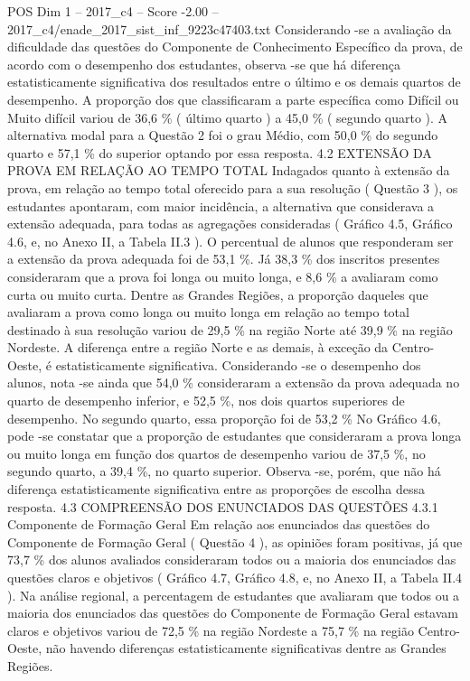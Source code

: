 \begin{textsample}{POS Dim 1 – 2017\_c4 – Score -2.00 – 2017\_c4/enade\_2017\_sist\_inf\_9223c47403.txt}
Considerando -se a avaliação da dificuldade das questões do Componente de Conhecimento Específico da prova, de acordo com o desempenho dos estudantes, observa -se que há diferença estatisticamente significativa dos resultados entre o último e os demais quartos de desempenho.
A proporção dos que classificaram a parte específica como Difícil ou Muito difícil variou de 36,6 \% ( último quarto ) a 45,0 \% ( segundo quarto ).
A alternativa modal para a Questão 2 foi o grau Médio, com 50,0 \% do segundo quarto e 57,1 \% do superior optando por essa resposta. 4.2 EXTENSÃO DA PROVA EM RELAÇÃO AO TEMPO TOTAL Indagados quanto à extensão da prova, em relação ao tempo total oferecido para a sua resolução ( Questão 3 ), os estudantes apontaram, com maior incidência, a alternativa que considerava a extensão adequada, para todas as agregações consideradas ( Gráfico 4.5, Gráfico 4.6, e, no Anexo II, a Tabela II.3 ).
O percentual de alunos que responderam ser a extensão da prova adequada foi de 53,1 \%.
Já 38,3 \% dos inscritos presentes consideraram que a prova foi longa ou muito longa, e 8,6 \% a avaliaram como curta ou muito curta.
Dentre as Grandes Regiões, a proporção daqueles que avaliaram a prova como longa ou muito longa em relação ao tempo total destinado à sua resolução variou de 29,5 \% na região Norte até 39,9 \% na região Nordeste.
A diferença entre a região Norte e as demais, à exceção da Centro-Oeste, é estatisticamente significativa.
Considerando -se o desempenho dos alunos, nota -se ainda que 54,0 \% consideraram a extensão da prova adequada no quarto de desempenho inferior, e 52,5 \%, nos dois quartos superiores de desempenho.
No segundo quarto, essa proporção foi de 53,2 \% No Gráfico 4.6, pode -se constatar que a proporção de estudantes que consideraram a prova longa ou muito longa em função dos quartos de desempenho variou de 37,5 \%, no segundo quarto, a 39,4 \%, no quarto superior.
Observa -se, porém, que não há diferença estatisticamente significativa entre as proporções de escolha dessa resposta. 4.3 COMPREENSÃO DOS ENUNCIADOS DAS QUESTÕES 4.3.1 Componente de Formação Geral Em relação aos enunciados das questões do Componente de Formação Geral ( Questão 4 ), as opiniões foram positivas, já que 73,7 \% dos alunos avaliados consideraram todos ou a maioria dos enunciados das questões claros e objetivos ( Gráfico 4.7, Gráfico 4.8, e, no Anexo II, a Tabela II.4 ).
Na análise regional, a percentagem de estudantes que avaliaram que todos ou a maioria dos enunciados das questões do Componente de Formação Geral estavam claros e objetivos variou de 72,5 \% na região Nordeste a 75,7 \% na região Centro-Oeste, não havendo diferenças estatisticamente significativas dentre as Grandes Regiões.

\end{textsample}
